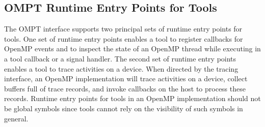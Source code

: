 %
%
%
%
%
%
%
%
%
%
%
%
%


\subsection{OMPT Runtime Entry Points for Tools}
\label{sec:entry-points}

The OMPT interface supports two principal sets of runtime entry points for tools. One
set of runtime entry points enables a tool to register callbacks for OpenMP
events and to inspect the state of an OpenMP thread while
executing in a tool callback or a signal handler. The second set of runtime entry points enables a
tool to trace activities on a device. When directed by the tracing
interface, an OpenMP implementation will trace activities on a device, collect
buffers full of trace records, and invoke callbacks on the host to
process these records.
Runtime entry points for tools in an OpenMP implementation
should not be global symbols since tools cannot rely on the visibility
of such symbols in general.

